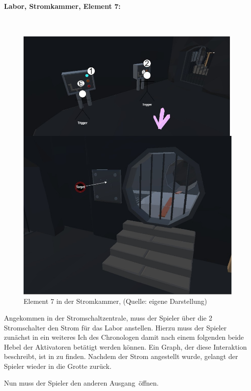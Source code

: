 \paragraph{Labor, Stromkammer, Element 7:}\label{p:lse7}
~
\begin{figure}[ht]
\centering
\includegraphics[width=0.8\linewidth]{content/pictures/Raetsel-L02_R01_R07.jpg}
\caption{Element 7 in der Stromkammer, (Quelle: eigene Darstellung)}
\label{fig:L02_R01_R07}
\end{figure}

Angekommen in der Stromschaltzentrale, muss der Spieler über die 2 Stromschalter den Strom für das Labor anstellen. Hierzu muss der Spieler zunächst in ein weiteres Ich des Chronologen  damit nach einem folgenden  beide Hebel der Aktivatoren betätigt werden können. Ein Graph, der diese Interaktion beschreibt, ist in  zu finden. Nachdem der Strom angestellt wurde, gelangt der Spieler wieder in die Grotte zurück.

Nun muss der Spieler den anderen Ausgang öffnen.
\newpage
